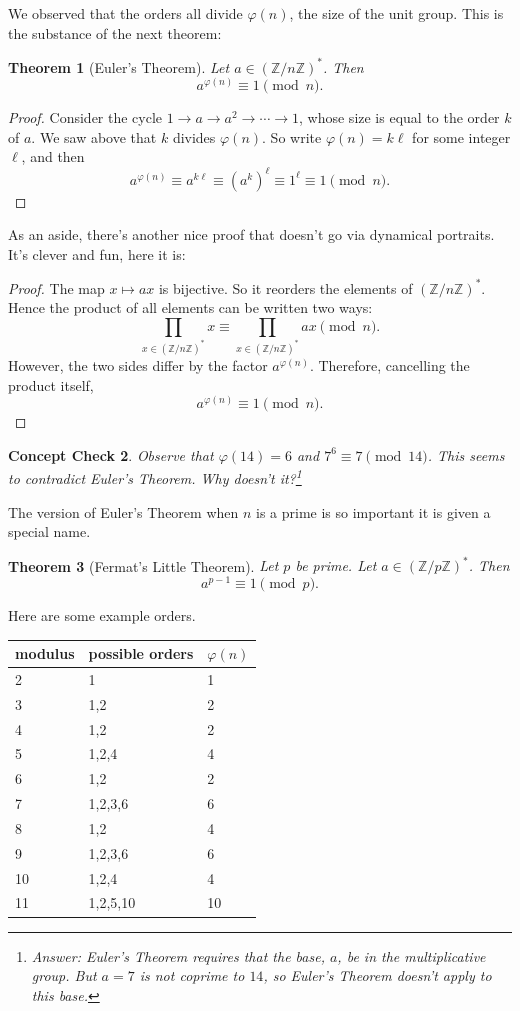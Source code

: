 \documentclass{article}
\theoremstyle{plain}
\newtheorem{theorem}{Theorem}
\newtheorem{checkin}[theorem]{Concept Check}
\theoremstyle{definition}
\theoremstyle{remark}
\numberwithin{theorem}{section}
\newcommand{\ZZ}{\mathbb{Z}}
\begin{document}
We observed that the orders all divide $\varphi(n)$, the size of the unit group.  This is the substance of the next theorem:

\begin{theorem}[Euler's Theorem]
Let $a \in (\ZZ/n\ZZ)^*$.  Then
\[
a^{\varphi(n)} \equiv 1 \pmod n.
\]
\end{theorem}

\begin{proof}
Consider the cycle $1 \rightarrow a \rightarrow a^2 \rightarrow \cdots \rightarrow 1$, whose size is equal to the order $k$ of $a$.  We saw above that $k$ divides $\varphi(n)$.  So write $\varphi(n) = k\ell$ for some integer $\ell$, and then
\[
a^{\varphi(n)} \equiv a^{k\ell} \equiv (a^k)^\ell \equiv 1^\ell \equiv 1 \pmod{n}.
\]
\end{proof}

As an aside, there's another nice proof that doesn't go via dynamical portraits.  It's clever and fun, here it is:

\begin{proof}
The map $x \mapsto ax$ is bijective.  So it reorders the elements of $(\ZZ/n\ZZ)^*$.  Hence the product of all elements can be written two ways:
\[
\prod_{x \in (\ZZ/n\ZZ)^*} x
\equiv
\prod_{x \in (\ZZ/n\ZZ)^*} ax \pmod n.
\]
However, the two sides differ by the factor $a^{\varphi(n)}$.  Therefore, cancelling the product itself,
\[
a^{\varphi(n)} \equiv 1 \pmod n.
\]
\end{proof}

\begin{checkin}
    Observe that $\varphi(14)=6$ and $7^6 \equiv 7 \pmod{14}$.
This seems to contradict Euler's Theorem.  Why doesn't it?\footnote{Answer:  Euler's Theorem requires that the base, $a$, be in the multiplicative group.  But $a=7$ is not coprime to $14$, so Euler's Theorem doesn't apply to this base.}
\end{checkin}

The version of Euler's Theorem when $n$ is a prime is so important it is given a special name.

\begin{theorem}[Fermat's Little Theorem]
Let $p$ be prime.
Let $a \in (\ZZ/p\ZZ)^*$.  Then
\[
a^{p-1} \equiv 1 \pmod p.
\]
\end{theorem}


Here are some example orders.
\\

\begin{tabular}{lll}
modulus & possible orders & $\varphi(n)$ \\
\hline
2 & 1 & 1 \\
3 & 1,2 & 2 \\
4 & 1,2 & 2 \\
5 & 1,2,4 & 4 \\
6 & 1,2 & 2 \\
7 & 1,2,3,6 & 6 \\
8 & 1,2 & 4 \\
9 & 1,2,3,6 & 6 \\
10 & 1,2,4 & 4 \\
11 & 1,2,5,10 & 10
\end{tabular}
\end{document}

